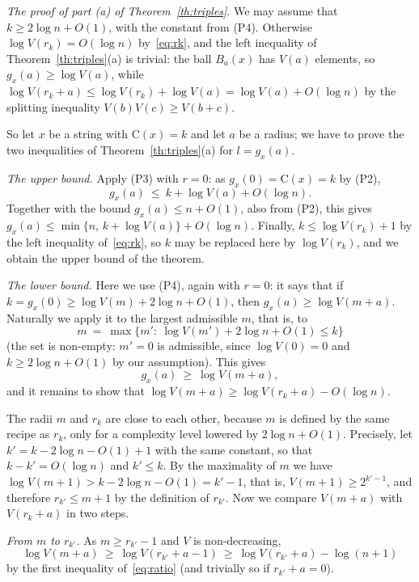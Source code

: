 \documentclass[11pt,a4paper]{article}
\theoremstyle{definition}
\newcommand{\C}{\mathrm{C}}
\renewcommand{\le}{\leqslant}
\renewcommand{\ge}{\geqslant}
\begin{document}
\medskip
\emph{The proof of part (a) of
Theorem~\ref{th:triples}}.
We may assume that $k\ge2\log n+O(1)$, with the constant from (P4). Otherwise
$\log V(r_k)=O(\log n)$ by~\eqref{eq:rk}, and the left inequality of
Theorem~\ref{th:triples}(a) is trivial: the ball $B_a(x)$ has $V(a)$ elements,
so $g_x(a)\ge\log V(a)$, while
$\log V(r_k+a)\le\log V(r_k)+\log V(a)=\log V(a)+O(\log n)$ by the
splitting inequality $V(b)V(c)\ge V(b+c)$.

So let $x$ be a string with $\C(x)=k$ and let $a$ be a radius; we have to prove
the two inequalities of Theorem~\ref{th:triples}(a) for $l=g_x(a)$.

\emph{The upper bound.} Apply (P3) with $r=0$: as $g_x(0)=\C(x)=k$ by (P2),
\[
  g_x(a)\ \le\ k+\log V(a)+O(\log n) .
\]
Together with the bound $g_x(a)\le n+O(1)$, also from (P2), this gives
$g_x(a)\le\min\{n,\,k+\log V(a)\}+O(\log n)$. Finally, $k\le\log V(r_k)+1$ by
the left inequality of~\eqref{eq:rk}, so $k$ may be replaced here by
$\log V(r_k)$, and we obtain the upper bound of the theorem.

\emph{The lower bound.} Here we use (P4), again with $r=0$: it says that if
$k=g_x(0)\ge\log V(m)+2\log n+O(1)$, then $g_x(a)\ge\log V(m+a)$. Naturally we
apply it to the largest admissible $m$, that is, to
\[
  m\ =\ \max\{m':\ \log V(m')+2\log n+O(1)\le k\}
\]
(the set is non-empty: $m'=0$ is admissible, since $\log V(0)=0$ and
$k\ge2\log n+O(1)$ by our assumption). This gives
\begin{equation}\label{eq:pointwise}
  g_x(a)\ \ge\ \log V(m+a) ,
\end{equation}
and it remains to show that $\log V(m+a)\ge\log V(r_k+a)-O(\log n)$.

The radii $m$ and $r_k$ are close to each other, because $m$ is defined by the
same recipe as $r_k$, only for a complexity level lowered by $2\log n+O(1)$.
Precisely, let $k'=k-2\log n-O(1)+1$ with the same constant, so that
$k-k'=O(\log n)$ and $k'\le k$. By the maximality of $m$ we have
$\log V(m+1)>k-2\log n-O(1)=k'-1$, that is, $V(m+1)\ge2^{k'-1}$, and therefore
$r_{k'}\le m+1$ by the definition of $r_{k'}$. Now we compare $V(m+a)$ with
$V(r_k+a)$ in two steps.

\emph{From $m$ to $r_{k'}$.} As $m\ge r_{k'}-1$ and $V$ is non-decreasing,
\[
  \log V(m+a)\ \ge\ \log V(r_{k'}+a-1)\ \ge\ \log V(r_{k'}+a)-\log(n+1)
\]
by the first inequality of~\eqref{eq:ratio} (and trivially so if
$r_{k'}+a=0$).
\end{document}

